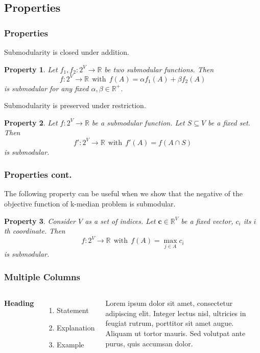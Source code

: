 \documentclass{beamer}
\newtheorem{property}{Property}
\newcommand{\bbR}{\mathbb{R}}
\begin{document}
\subsection{Properties}
\begin{frame}
\frametitle{Properties}

Submodularity is closed under addition.
\begin{property}
  \label{prop:addition}
  Let $f_1, f_2: 2^V \rightarrow \bbR$ be two submodular functions. Then 
  $$f: 2^V\rightarrow \bbR~~\text{with}~~ f(A) = \alpha f_1(A) + \beta f_2(A)$$ 
is submodular for any fixed $\alpha, \beta \in \bbR^+$.
\end{property}

Submodularity is preserved under restriction.
\begin{property}
  \label{prop:restriction}
  Let $f: 2^V \rightarrow \bbR$ be a submodular function. Let $S\subseteq V$ be a fixed set. Then
$$f':2^V \rightarrow \bbR~~\text{with}~~f'(A) = f(A\cap S)$$
is submodular.
\end{property}
\end{frame}


\begin{frame}
\frametitle{Properties cont.}
The following property can be useful when we show that the negative of the objective function of k-median problem is submodular.
\begin{property}
  \label{prop:max}
Consider $V$ as a set of indices. Let $\mathbf{c}\in \bbR^V$ be a fixed vector, $c_i$ its $i$th coordinate. Then 
$$f:2^V \rightarrow \bbR~~\text{with}~~ f(A) = \max_{j\in A}c_i$$ 
is submodular.
\end{property}
\end{frame}






\begin{frame}
\frametitle{Multiple Columns}
\begin{columns}[c] %

\textbf{Heading}
\begin{enumerate}
\item Statement
\item Explanation
\item Example
\end{enumerate}

Lorem ipsum dolor sit amet, consectetur adipiscing elit. Integer lectus nisl, ultricies in feugiat rutrum, porttitor sit amet augue. Aliquam ut tortor mauris. Sed volutpat ante purus, quis accumsan dolor.

\end{columns}
\end{frame}
\end{document}
